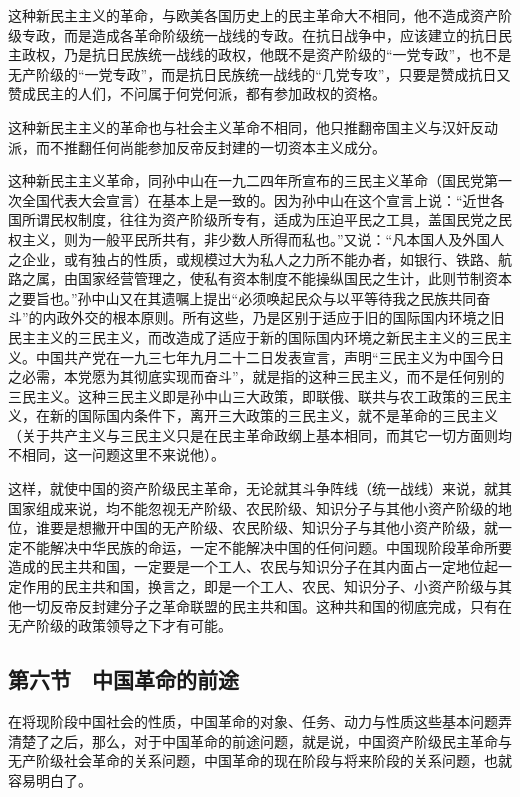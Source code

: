 这种新民主主义的革命，与欧美各国历史上的民主革命大不相同，他不造成资产阶级专政，而是造成各革命阶级统一战线的专政。在抗日战争中，应该建立的抗日民主政权，乃是抗日民族统一战线的政权，他既不是资产阶级的“一党专政”，也不是无产阶级的“一党专政”，而是抗日民族统一战线的“几党专攻”，只要是赞成抗日又赞成民主的人们，不问属于何党何派，都有参加政权的资格。

这种新民主主义的革命也与社会主义革命不相同，他只推翻帝国主义与汉奸反动派，而不推翻任何尚能参加反帝反封建的一切资本主义成分。

这种新民主主义革命，同孙中山在一九二四年所宣布的三民主义革命（国民党第一次全国代表大会宣言）在基本上是一致的。因为孙中山在这个宣言上说：“近世各国所谓民权制度，往往为资产阶级所专有，适成为压迫平民之工具，盖国民党之民权主义，则为一般平民所共有，非少数人所得而私也。”又说：“凡本国人及外国人之企业，或有独占的性质，或规模过大为私人之力所不能办者，如银行、铁路、航路之属，由国家经营管理之，使私有资本制度不能操纵国民之生计，此则节制资本之要旨也。”孙中山又在其遗嘱上提出“必须唤起民众与以平等待我之民族共同奋斗”的内政外交的根本原则。所有这些，乃是区别于适应于旧的国际国内环境之旧民主主义的三民主义，而改造成了适应于新的国际国内环境之新民主主义的三民主义。中国共产党在一九三七年九月二十二日发表宣言，声明“三民主义为中国今日之必需，本党愿为其彻底实现而奋斗”，就是指的这种三民主义，而不是任何别的三民主义。这种三民主义即是孙中山三大政策，即联俄、联共与农工政策的三民主义，在新的国际国内条件下，离开三大政策的三民主义，就不是革命的三民主义（关于共产主义与三民主义只是在民主革命政纲上基本相同，而其它一切方面则均不相同，这一问题这里不来说他）。

这样，就使中国的资产阶级民主革命，无论就其斗争阵线（统一战线）来说，就其国家组成来说，均不能忽视无产阶级、农民阶级、知识分子与其他小资产阶级的地位，谁要是想撇开中国的无产阶级、农民阶级、知识分子与其他小资产阶级，就一定不能解决中华民族的命运，一定不能解决中国的任何问题。中国现阶段革命所要造成的民主共和国，一定要是一个工人、农民与知识分子在其内面占一定地位起一定作用的民主共和国，换言之，即是一个工人、农民、知识分子、小资产阶级与其他一切反帝反封建分子之革命联盟的民主共和国。这种共和国的彻底完成，只有在无产阶级的政策领导之下才有可能。

\subsection{第六节　中国革命的前途}

在将现阶段中国社会的性质，中国革命的对象、任务、动力与性质这些基本问题弄清楚了之后，那么，对于中国革命的前途问题，就是说，中国资产阶级民主革命与无产阶级社会革命的关系问题，中国革命的现在阶段与将来阶段的关系问题，也就容易明白了。

